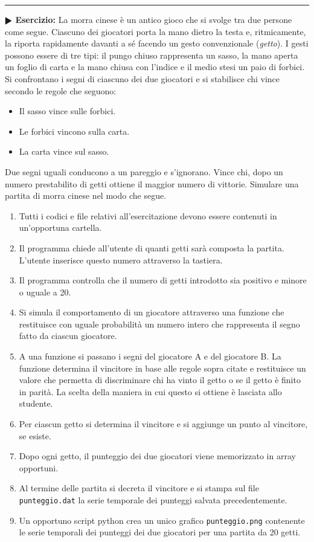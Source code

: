 \documentclass[11pt]{article}
\begin{document}
\hrule
\vspace{2mm}
\textbf{$\RHD$ Esercizio:}
La morra cinese \`e un antico gioco che si svolge tra due persone come segue.
Ciascuno dei giocatori porta la mano dietro la testa e, ritmicamente, la riporta
rapidamente davanti a s\'e facendo un gesto convenzionale ({\em getto}). 
I gesti possono essere di tre tipi: il pungo chiuso rappresenta un sasso, la mano aperta un foglio di carta e la mano chiusa con l'indice e il medio stesi un paio di forbici. Si confrontano i segni di ciascuno dei due giocatori e si stabilisce chi vince secondo le regole che seguono:
\begin{itemize}
\item Il sasso vince sulle forbici. 
\item Le forbici vincono sulla carta.
\item La carta vince sul sasso.
\end{itemize}
Due segni uguali conducono a un pareggio e s'ignorano. Vince chi, dopo un numero prestabilito di getti ottiene il maggior numero di vittorie. Simulare una partita di morra cinese nel modo che segue.
\begin{enumerate}
\item Tutti i codici e file relativi all'esercitazione devono essere contenuti in un'opportuna cartella.
\item Il programma chiede all'utente di quanti getti sar\`a composta la partita.
L'utente inserisce questo numero attraverso la tastiera.
\item Il programma controlla che il numero di getti introdotto sia positivo e minore o uguale a 20.
\item Si simula il comportamento di un giocatore attraverso una funzione che
restituisce con uguale probabilit\`a un numero intero che rappresenta il segno
fatto da ciascun giocatore.
\item  A una funzione si passano i segni del giocatore A e del giocatore B. La
funzione determina il vincitore in base alle regole sopra citate e restituisce
un valore che permetta di discriminare chi ha vinto il getto o se il getto \`e finito in parit\`a. La scelta della maniera in cui questo si ottiene \`e lasciata
allo studente.
\item Per ciascun getto si determina il vincitore e si aggiunge un punto al vincitore, se esiste.
\item Dopo ogni getto, il punteggio dei due giocatori viene memorizzato in array opportuni.
\item Al termine delle partita si decreta il vincitore e si stampa sul file \texttt{punteggio.dat} la serie temporale dei punteggi salvata precedentemente.
\item Un opportuno script python crea un unico grafico \texttt{punteggio.png} contenente le serie temporali dei punteggi dei due giocatori per una partita da 20 getti.

\end{enumerate}
\end{document}

